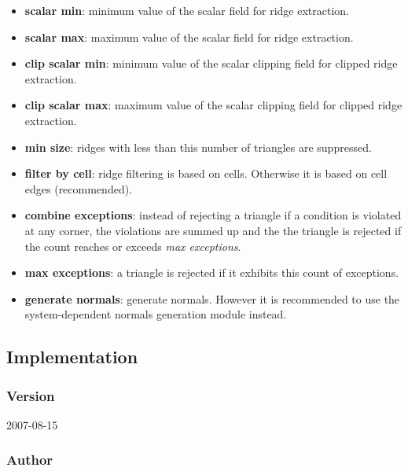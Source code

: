 \begin{itemize}
\item
  \textbf{scalar min}: minimum value of the scalar field for ridge extraction.

\item
  \textbf{scalar max}: maximum value of the scalar field for ridge extraction.

\item
  \textbf{clip scalar min}: minimum value of the scalar clipping field for clipped ridge extraction.

\item
  \textbf{clip scalar max}: maximum value of the scalar clipping field for clipped ridge extraction.

\item
  \textbf{min size}: ridges with less than this number of triangles are suppressed.

\item
  \textbf{filter by cell}: ridge filtering is based on cells. Otherwise it is based on cell edges (recommended).

\item
  \textbf{combine exceptions}: instead of rejecting a triangle if a condition is violated at any corner, the violations are summed up and the the triangle is rejected if the count reaches or exceeds \emph{max exceptions}.

\item
  \textbf{max exceptions}: a triangle is rejected if it exhibits this count of exceptions.

\item
  \textbf{generate normals}: generate normals. However it is recommended to use the system-dependent normals generation module instead.

\end{itemize}


\subsection{Implementation}


\subsubsection{Version}

2007-08-15


\subsubsection{Author}

